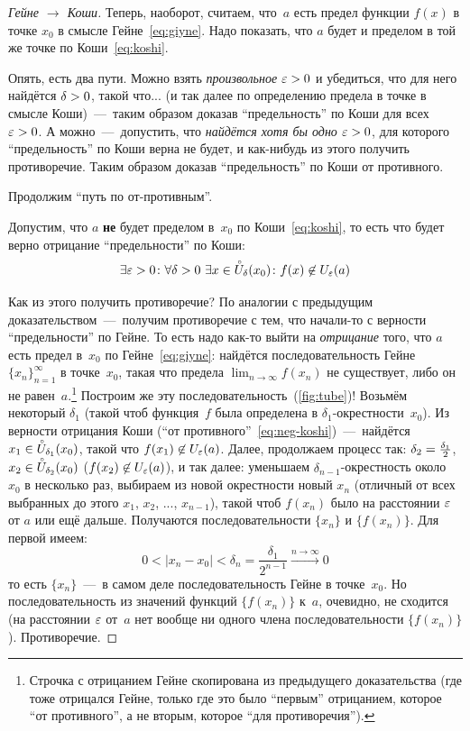 \documentclass[a4paper,12pt]{article}
\renewcommand{\mathring}[1]{\accentset{\circ}{#1}}
\begin{document}
  \begin{proof}[Гейне $\to$ Коши]
    Теперь, наоборот, считаем, что~$a$ есть предел функции $f(x)$ в точке $x_0$ в смысле Гейне~\eqref{eq:giyne}.
    Надо показать, что $a$ будет и пределом в той же точке по Коши~\eqref{eq:koshi}.

    Опять, есть два пути.
    Можно взять \emph{произвольное} $\eps \hm> 0$ и убедиться, что для него найдётся $\delta \hm> 0$, такой что... (и так далее по определению предела в точке в смысле Коши)~---~таким образом доказав ``предельность'' по Коши для всех $\eps \hm> 0$.
    А можно~---~допустить, что \emph{найдётся хотя бы одно} $\varepsilon > 0$, для которого ``предельность'' по Коши верна не будет, и как-нибудь из этого получить противоречие.
    Таким образом доказав ``предельность'' по Коши от противного.

    Продолжим ``путь по от-противным''.

    Допустим, что $a$ \textbf{не} будет пределом в~$x_0$ по Коши~\eqref{eq:koshi}, то есть что будет верно отрицание ``предельности'' по Коши:
    \begin{equation}\label{eq:neg-koshi}
      \exists \eps > 0\colon \forall \delta > 0\ \exists x \in \mathring U_{\delta}(x_0)\colon f(x) \not\in U_{\eps}(a)
    \end{equation}

    Как из этого получить противоречие?
    По аналогии с предыдущим доказательством~---~получим противоречие с тем, что начали-то с верности ``предельности'' по Гейне.
    То есть надо как-то выйти на \emph{отрицание} того, что $a$ есть предел в~$x_0$ по Гейне~\eqref{eq:giyne}: найдётся последовательность Гейне $\{x_n\}_{n=1}^{\infty}$ в точке~$x_0$, такая что предела $\lim_{n \to \infty} f(x_n)$ не существует, либо он не равен~$a$.\footnote{
      Строчка с отрицанием Гейне скопирована из предыдущего доказательства (где тоже отрицался Гейне, только где это было ``первым'' отрицанием, которое ``от противного'', а не вторым, которое ``для противоречия'').
    }
    Построим же эту последовательность~(\ref{fig:tube})!
    Возьмём некоторый $\delta_1$ (такой чтоб функция~$f$ была определена в $\delta_1$-окрестности~$x_0$).
    Из верности отрицания Коши (``от противного''~\eqref{eq:neg-koshi})~---~найдётся $x_1 \hm\in \mathring U_{\delta_1}(x_0)$, такой что $f(x_1) \hm{\not\in} U_{\eps}(a)$.
    Далее, продолжаем процесс так: $\delta_2 \hm= \frac{\delta_1}{2}$, $x_2 \hm\in \mathring U_{\delta_2}(x_0)$ ($f(x_2) \hm{\not\in} U_{\eps}(a)$), и так далее: уменьшаем $\delta_{n - 1}$-окрестность около~$x_0$ в несколько раз, выбираем из новой окрестности новый $x_n$ (отличный от всех выбранных до этого $x_1$, $x_2$, ..., $x_{n - 1}$), такой чтоб $f(x_n)$ было на расстоянии $\varepsilon$ от $a$ или ещё дальше.
    Получаются последовательности $\{x_n\}$ и $\{f(x_n)\}$.
    Для первой имеем:
    \[
      0 < |x_n - x_0| < \delta_n = \frac{\delta_1}{2^{n - 1}} \xrightarrow{n \to\infty} 0
    \]
    то есть $\{x_n\}$~---~в самом деле последовательность Гейне в точке~$x_0$.
    Но последовательность из значений функций $\{f(x_n)\}$ к~$a$, очевидно, не сходится (на расстоянии $\varepsilon$ от~$a$ нет вообще ни одного члена последовательности $\{f(x_n)\}$).
    Противоречие.
    

\end{proof}
\end{document}
